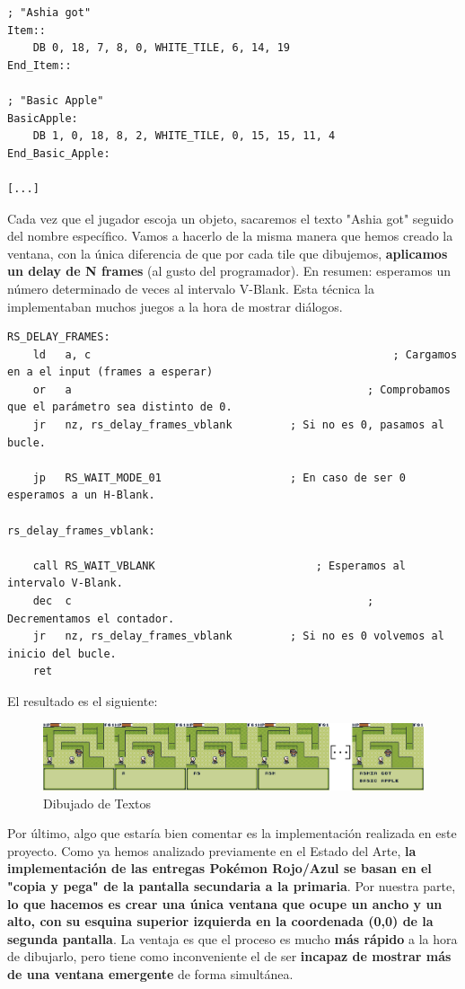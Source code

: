 \begin{lstlisting}[caption={Textos en ROM}, label={code:texts}]
; "Ashia got"
Item::
    DB 0, 18, 7, 8, 0, WHITE_TILE, 6, 14, 19
End_Item::

; "Basic Apple"
BasicApple:	
	DB 1, 0, 18, 8, 2, WHITE_TILE, 0, 15, 15, 11, 4
End_Basic_Apple:

[...]
\end{lstlisting}

Cada vez que el jugador escoja un objeto, sacaremos el texto "Ashia got" seguido del nombre específico. Vamos a hacerlo de la misma manera que hemos creado la ventana, con la única diferencia de que por cada tile que dibujemos, \textbf{aplicamos un delay de N frames} (al gusto del programador). En resumen: esperamos un número determinado de veces al intervalo V-Blank. Esta técnica la implementaban muchos juegos a la hora de mostrar diálogos.

\begin{lstlisting}[caption={Delay}, label={code:delay}]
RS_DELAY_FRAMES:
	ld 	 a, c 												; Cargamos en a el input (frames a esperar)
	or 	 a 												; Comprobamos que el parámetro sea distinto de 0.
	jr 	 nz, rs_delay_frames_vblank  		; Si no es 0, pasamos al bucle.

	jp 	 RS_WAIT_MODE_01 					; En caso de ser 0 esperamos a un H-Blank.

rs_delay_frames_vblank:

	call RS_WAIT_VBLANK 						; Esperamos al intervalo V-Blank.
	dec  c 												; Decrementamos el contador.
	jr 	 nz, rs_delay_frames_vblank 		; Si no es 0 volvemos al inicio del bucle.
	ret
\end{lstlisting}

El resultado es el siguiente:

\begin{figure}[h]
\centering
\includegraphics[width=1\textwidth]{include/images/desarrollo/dialogitem.png}
\caption{Dibujado de Textos}
\label{figure:drawtexts}
\end{figure}

Por último, algo que estaría bien comentar es la implementación realizada en este proyecto. Como ya hemos analizado previamente en el Estado del Arte, \textbf{la implementación de las entregas Pokémon Rojo/Azul se basan en el "copia y pega" de la pantalla secundaria a la primaria}. Por nuestra parte, \textbf{lo que hacemos es crear una única ventana que ocupe un ancho y un alto, con su esquina superior izquierda en la coordenada (0,0) de la segunda pantalla}. La ventaja es que el proceso es mucho \textbf{más rápido} a la hora de dibujarlo, pero tiene como inconveniente el de ser \textbf{incapaz de mostrar más de una ventana emergente} de forma simultánea.

